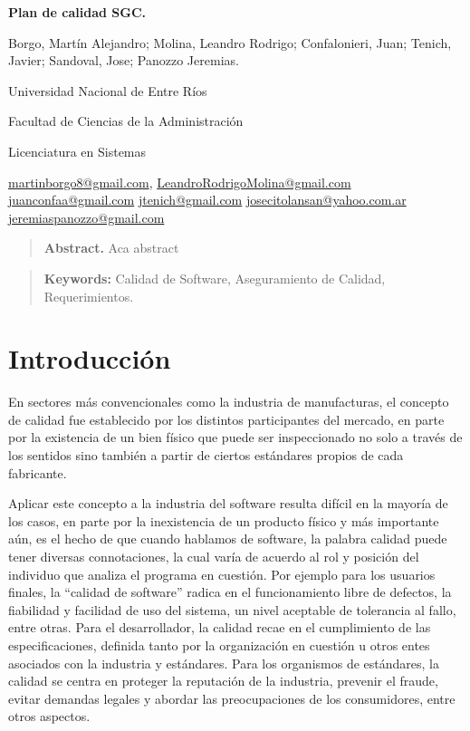 \documentclass[a4paper,10pt]{article}
\begin{document}
	\centering
	{\fontsize{14}{17}\bfseries Plan de calidad SGC.\par}
	{\small Borgo, Martín Alejandro; Molina, Leandro Rodrigo; Confalonieri, Juan; Tenich, Javier; Sandoval, Jose; Panozzo Jeremias.\par}
	{\normalsize Universidad Nacional de Entre Ríos\par}
	{\normalsize Facultad de Ciencias de la Administración\par}
	{\normalsize Licenciatura en Sistemas\par}
	{\small
		\href{mailto:martinborgo8@gmail.com}{martinborgo8@gmail.com},
		\href{mailto:LeandroRodrigoMolina@gmail.com}{LeandroRodrigoMolina@gmail.com}
		\href{mailto:juanconfaa@gmail.com}{juanconfaa@gmail.com}
		\href{mailto:jtenich@gmail.com}{jtenich@gmail.com}
		\href{mailto:josecitolansan@yahoo.com.ar}{josecitolansan@yahoo.com.ar}
		\href{mailto:jeremiaspanozzo@gmail.com}{jeremiaspanozzo@gmail.com}
		\par}	
	{\begin{quote} \small \justify\textbf{Abstract.} Aca abstract \end{quote} \par}
	{\begin{quote} \small \justify\textbf{Keywords:} Calidad de Software, Aseguramiento de Calidad, Requerimientos. \end{quote} \par}
	
	\justifying
	
	\section{Introducción}
	En sectores más convencionales como la industria de manufacturas, el concepto de calidad fue
	establecido por los distintos participantes del mercado, en parte por la existencia de un bien
	físico que puede ser inspeccionado no solo a través de los sentidos sino también a partir de
	ciertos estándares propios de cada fabricante.
	
	Aplicar este concepto a la industria del software resulta difícil en la mayoría de los casos, en
	parte por la inexistencia de un producto físico y más importante aún, es el hecho de que cuando
	hablamos de software, la palabra calidad puede tener diversas connotaciones, la cual varía de
	acuerdo al rol y posición del individuo que analiza el programa en cuestión. Por ejemplo para los
	usuarios finales, la “calidad de software” radica en el funcionamiento libre de defectos, la
	fiabilidad y facilidad de uso del sistema, un nivel aceptable de tolerancia al fallo, entre otras. Para
	el desarrollador, la calidad recae en el cumplimiento de las especificaciones, definida tanto por la
	organización en cuestión u otros entes asociados con la industria y estándares. Para los
	organismos de estándares, la calidad se centra en proteger la reputación de la industria,
	prevenir el fraude, evitar demandas legales y abordar las preocupaciones de los consumidores,
	entre otros aspectos.
	
\end{document}

